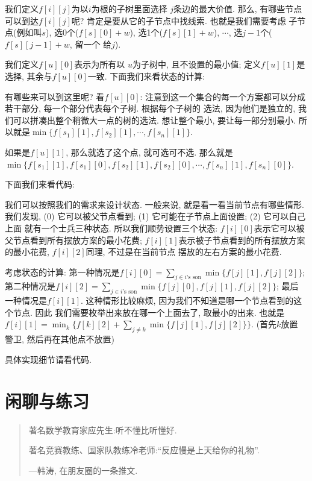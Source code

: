  我们定义$f[i][j]$为以$i$为根的子树里面选择
$j$条边的最大价值. 那么, 有哪些节点可以到达$f[i][j]$呢? 肯定是要从它的子节点中找线索. 也就是我们需要考虑
子节点(例如叫$s$), 选0个($f[s][0]+w$), 选1个($f[s][1]+w$), $\cdots$, 选$j-1$个($f[s][j-1]+w$, 留一个
给$j$). 

我们定义$f[u][0]$表示为所有以
$u$为子树中, 且不设置的最小值; 定义$f[u][1]$是选择, 其余与$f[u][0]$一致. 下面我们来看状态的计算: 

有哪些来可以到这里呢? 
看$f[u][0]$: 注意到这一个集合的每一个方案都可以分成若干部分, 每一个部分代表每个子树. 根据每个子树的
选法, 因为他们是独立的, 我们可以拼凑出整个稍微大一点的树的选法. 想让整个最小, 要让每一部分别最小. 
所以就是$\min\{f[s_1][1],f[s_2][1],\cdots, f[s_n][1]\}$. 

如果是$f[u][1]$, 那么就选了这个点, 就可选可不选. 
那么就是$\min\{f[s_1][1],f[s_1][0],f[s_2][1],f[s_2][0],\cdots, f[s_n][1],f[s_n][0]\}$.

下面我们来看代码: 

 我们可以按照我们的需求来设计状态. 
一般来说, 就是看一看当前节点有哪些情形. 我们发现, (0) 它可以被父节点看到; (1) 它可能在子节点上面设置; (2) 它可以自己上面
就有一个士兵三种状态. 所以我们顺势设置三个状态: $f[i][0]$表示它可以被父节点看到所有摆放方案的最小花费; 
$f[i][1]$表示被子节点看到的所有摆放方案的最小花费, $f[i][2]$同理, 不过是在当前节点
摆放的左右方案的最小花费. 

考虑状态的计算: 第一种情况是$f[i][0]=\sum_{j\in i\text{'s son}}\min\{f[j][1], f[j][2]\}$; 
第二种情况是$f[i][2]=\sum_{j\in i\text{'s son}}\min\{f[j][0], f[j][1], f[j][2]\}$; 最后
一种情况是$f[i][1]$. 这种情形比较麻烦, 因为我们不知道是哪一个节点看到的这个节点. 因此
我们需要枚举出来放在哪一个上面去了, 取最小的出来. 也就是
$f[i][1]=\min_k \{f[k][2]+\sum_{j\neq k}\min \{f[j][1], f[j][2]\}\}$. (首先$k$放置
警卫, 然后再在其他点不放置)

具体实现细节请看代码. 

\section*{闲聊与练习}

\begin{quote}
    著名数学教育家应先生:听不懂比听懂好.

    著名竞赛教练、国家队教练冷老师:``反应慢是上天给你的礼物''.

    \hfill ---韩涛, 在朋友圈的一条推文.  
\end{quote}


